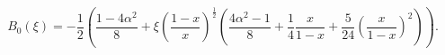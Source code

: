 \[B_{0}(\xi)=-\frac{1}{2}\left(\frac{1-4\alpha^{2}}{8}+\xi\left(\frac{1-x}{x}%
\right)^{\frac{1}{2}}\left(\frac{4\alpha^{2}-1}{8}+\frac{1}{4}\frac{x}{1-x}+%
\frac{5}{24}\left(\frac{x}{1-x}\right)^{2}\right)\right).\]
